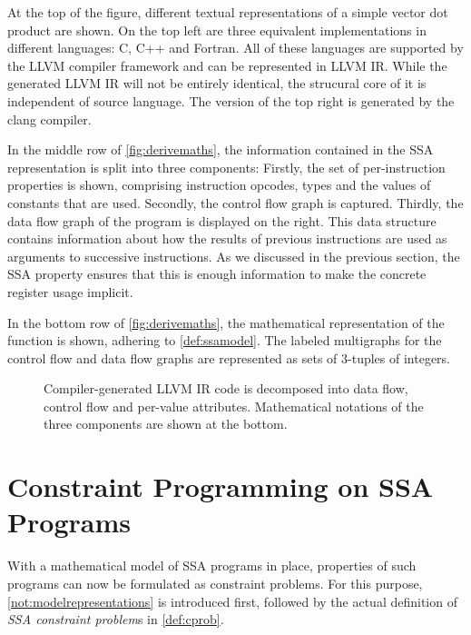     At the top of the figure, different textual representations of a simple
    vector dot product are shown.
    On the top left are three equivalent implementations in different languages:
    C, C++ and Fortran.
    All of these languages are supported by the LLVM compiler framework and
    can be represented in LLVM IR.
    While the generated LLVM IR will not be entirely identical, the strucural
    core of it is independent of source language.
    The version of the top right is generated by the clang compiler.

    In the middle row of \autoref{fig:derivemaths}, the information contained in
    the SSA representation is split into three components:
    Firstly, the set of per-instruction properties is shown, comprising
    instruction opcodes, types and the values of constants that are used.
    Secondly, the control flow graph is captured.
    Thirdly, the data flow graph of the program is displayed on the right.
    This data structure contains information about how the results of previous
    instructions are used as arguments to successive instructions.
    As we discussed in the previous section, the SSA property ensures that this
    is enough information to make the concrete register usage implicit.

    In the bottom row of \autoref{fig:derivemaths}, the mathematical
    representation of the function is shown, adhering to \autoref{def:ssamodel}.
    The labeled multigraphs for the control flow and data flow graphs are
    represented as sets of $3$-tuples of integers.

\begin{figure}[p]

\caption{Compiler-generated LLVM IR code is decomposed into data flow, control
         flow and per-value attributes.
         Mathematical notations of the three components are shown at the
         bottom.}
\label{fig:derivemaths}
\end{figure}

\section{Constraint Programming on SSA Programs}

    With a mathematical model of SSA programs in place, properties of such
    programs can now be formulated as constraint problems.
    For this purpose, \autoref{not:modelrepresentations} is introduced first,
    followed by the actual definition of {\em SSA constraint problem}s in
    \autoref{def:cprob}.


